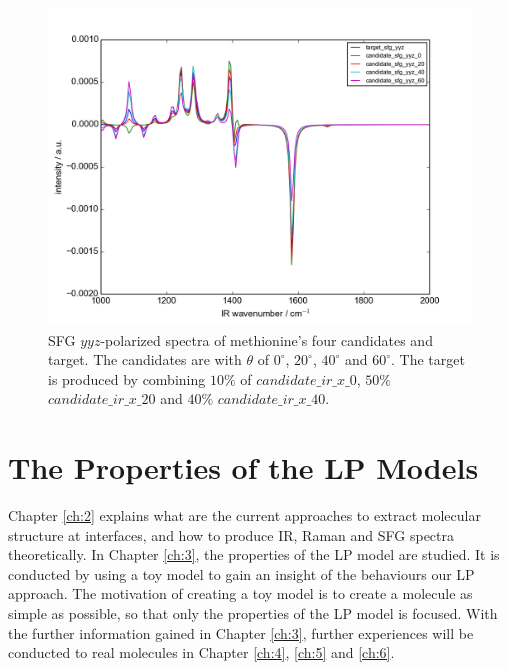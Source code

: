 \begin{figure}[!ht]
\centering
\includegraphics[scale=0.5]{Figures/Met_candidates_plotting_sfg_yyz.png}
\caption{SFG $yyz$-polarized spectra of methionine's four candidates and target. The candidates are with $\theta$ of $0^{\circ}$, $20^{\circ}$, $40^{\circ}$ and $60^{\circ}$. The target is produced by combining $10\%$ of $candidate\_ir\_x\_0$, $50\%$ $candidate\_ir\_x\_20$ and $40\%$ $candidate\_ir\_x\_40$.} \label{fig:2.5}
\end{figure}

\section{The Properties of the LP Models}
Chapter \ref{ch:2} explains what are the current approaches to extract molecular structure at interfaces, and how to produce IR, Raman and SFG spectra theoretically. In Chapter \ref{ch:3}, the properties of the LP model are studied. It is conducted by using a toy model to gain an insight of the behaviours our LP approach. The motivation of creating a toy model is to create a molecule as simple as possible, so that only the properties of the LP model is focused. With the further information gained in Chapter \ref{ch:3}, further experiences will be conducted to real molecules in Chapter \ref{ch:4}, \ref{ch:5} and \ref{ch:6}.